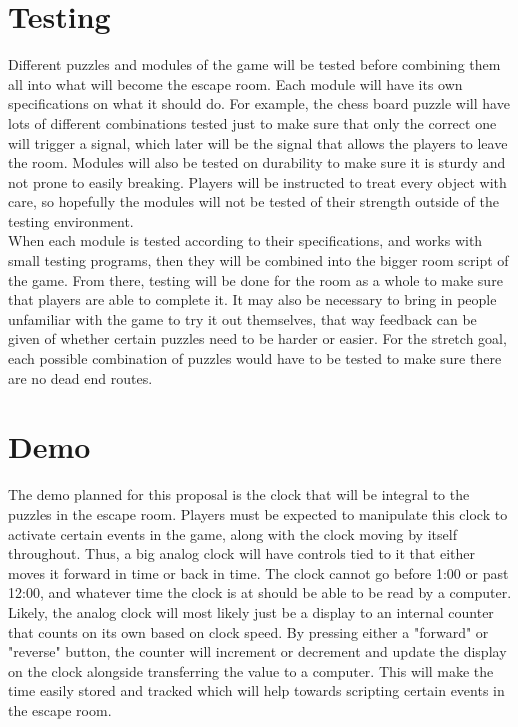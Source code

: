 \documentclass[conference]{IEEEtran}
\begin{document}
\section{Testing}
Different puzzles and modules of the game will be tested before combining
them all into what will become the escape room. Each module will have its
own specifications on what it should do. For example, the chess board puzzle
will have lots of different combinations tested just to make sure that only
the correct one will trigger a signal, which later will be the signal that
allows the players to leave the room. Modules will also be tested on
durability to make sure it is sturdy and not prone to easily breaking.
Players will be instructed to treat every object with care, so hopefully
the modules will not be tested of their strength outside of the testing
environment.
\\
\indent When each module is tested according to their specifications, and works
with small testing programs, then they will be combined into the bigger
room script of the game. From there, testing will be done for the room
as a whole to make sure that players are able to complete it. It may also
be necessary to bring in people unfamiliar with the game to try it out
themselves, that way feedback can be given of whether certain puzzles
need to be harder or easier. For the stretch goal, each possible combination
of puzzles would have to be tested to make sure there are no dead end routes.

\section{Demo}
The demo planned for this proposal is the clock that will be integral to
the puzzles in the escape room. Players must be expected to manipulate
this clock to activate certain events in the game, along with the clock
moving by itself throughout. Thus, a big analog clock will have controls
tied to it that either moves it forward in time or back in time. The
clock cannot go before 1:00 or past 12:00, and whatever time the clock
is at should be able to be read by a computer.
\\
\indent Likely, the analog clock will most likely just be a display to an internal
counter that counts on its own based on clock speed. By pressing either a
"forward" or "reverse" button, the counter will increment or decrement
and update the display on the clock alongside transferring the value to
a computer. This will make the time easily stored and tracked which will
help towards scripting certain events in the escape room.
\end{document}
